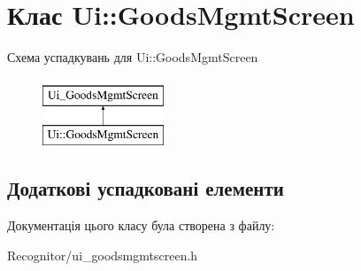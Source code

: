 \hypertarget{classUi_1_1GoodsMgmtScreen}{\section{Клас Ui\-:\-:Goods\-Mgmt\-Screen}
\label{classUi_1_1GoodsMgmtScreen}
}
Схема успадкувань для Ui\-:\-:Goods\-Mgmt\-Screen\begin{figure}[H]
\begin{center}
\leavevmode
\includegraphics[height=2.000000cm]{classUi_1_1GoodsMgmtScreen}
\end{center}
\end{figure}
\subsection*{Додаткові успадковані елементи}


Документація цього класу була створена з файлу\-:\begin{DoxyCompactItemize}
\item 
Recognitor/ui\-\_\-goodsmgmtscreen.\-h\end{DoxyCompactItemize}

